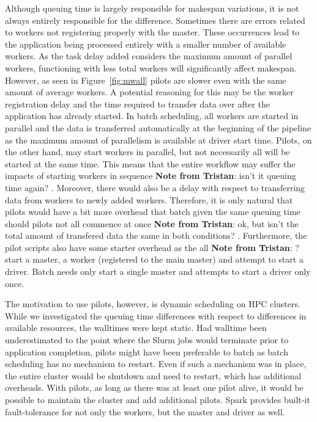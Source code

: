 \documentclass{IEEEtran}
\newcommand{\tristan}[1]{\color{red}\textbf{Note from Tristan}:
      #1 \color{black}}
\newcommand{\TG}[1]{\tristan{#1}}
\begin{document}
Although queuing time is largely responsible for makespan variations, it is not
always entirely responsible for the difference. Sometimes there are errors related
to workers not registering properly with the master. These occurrences lead to the 
application being processed entirely with a smaller number of available workers. As the task
delay added considers the maximum amount of parallel workers, functioning with less total workers
will significantly affect makespan. However, as seen in Figure~\ref{fig:mwall}
pilots are slower even with the same amount of average workers. A potential reasoning for this
may be the worker registration delay and the time required to transfer data
over after the application has already started. In batch scheduling, all workers are started in
parallel and the data is transferred automatically at the beginning of the pipeline as the maximum amount
of parallelism is available at driver start time. Pilots, on the other hand, may start workers in parallel,
but not necessarily all will be started at the same time. This means that the entire 
workflow may suffer the impacts of starting workers in sequence \TG{isn't it queuing time again?}. Moreover, there would also
be a delay with respect to transferring data from workers to newly added workers. Therefore,
it is only natural that pilots would have a bit more overhead that batch given the same
queuing time should pilots not all commence at once \TG{ok, but isn't the total amount of transfered data the same in both conditions?}.
 Furthermore, the pilot scripts also
have some starter overhead as the all \TG{?} start a master, a worker (registered to the main
master) and attempt to start a driver. Batch needs only start a single master and attempts to start
a driver only once.

The motivation to use pilots, however, is dynamic scheduling on HPC clusters. While we
investigated the queuing time differences with respect to differences in available resources,
the walltimes were kept static. Had walltime been underestimated to the point where the Slurm jobs
would terminate prior to application completion, pilots might have been preferable to batch
as batch scheduling has no mechanism to restart. Even if such a mechanism was in place, the entire
cluster would be shutdown and need to restart, which has additional overheads. With pilots, as long as 
there was at least one pilot alive, it would be possible to maintain the cluster and add additional pilots.
Spark provides built-it fault-tolerance for not only the workers, but the master and driver as well.
\end{document}
